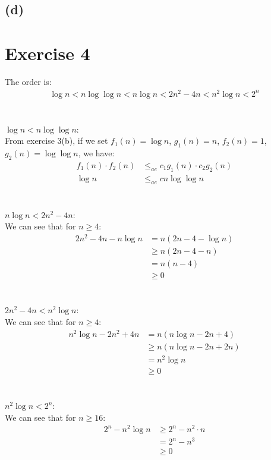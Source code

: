 \documentclass{article}
\begin{document}
\subsection*{(d)}


\section*{Exercise 4}
The order is:
\begin{align*}
   \log n < n \log \log n < n \log n < 2n^2 - 4n < n^2 \log n < 2^n
\end{align*}
\\
\\
\(\log n < n \log \log n\): \\
From exercise 3(b), if we set \(f_1(n) = \log n\), \(g_1(n) = n\), \(f_2(n) = 1\), \(g_2(n) = \log \log n\), we have:
\begin{align*}
   f_1(n) \cdot f_2(n) &\leq_{ae} c_1 g_1(n) \cdot c_2 g_2(n) \\
   \log n &\leq_{ae} c n \log \log n
\end{align*}
\\
\\
\(n \log n < 2n^2 - 4n\): \\
We can see that for \(n \geq 4\):
\begin{align*}
   2n^2 - 4n - n \log n &= n(2n - 4 - \log n) \\
   &\geq n(2n - 4 - n) \\
   &= n(n - 4) \\
   &\geq 0
\end{align*}
\\
\\
\(2n^2 - 4n < n^2 \log n\): \\
We can see that for \(n \geq 4\):
\begin{align*}
   n^2 \log n - 2n^2 + 4n &= n(n \log n - 2n + 4) \\
   &\geq n(n \log n - 2n + 2n) \\
   &= n^2 \log n \\
   &\geq 0
\end{align*}
\\
\\
\(n^2 \log n < 2^n\): \\
We can see that for \(n \geq 16\):
\begin{align*}
   2^n - n^2 \log n &\geq 2^n - n^2 \cdot n \\
   &= 2^n - n^3 \\
   &\geq 0
\end{align*}
\end{document}
